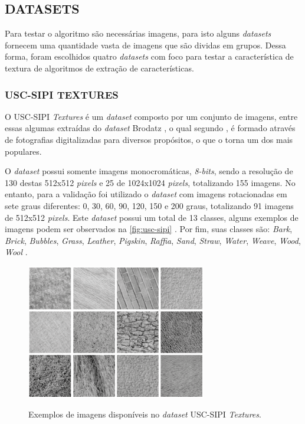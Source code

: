 \subsection{DATASETS}
\label{subsec:datasets}

\par Para testar o algoritmo são necessárias imagens, para isto alguns \textit{datasets} fornecem uma quantidade vasta de imagens que são dividas em grupos. Dessa forma, foram escolhidos quatro \textit{datasets} com foco para testar a característica de textura de algoritmos de extração de características.

\subsubsection{USC-SIPI TEXTURES}
\label{subsubsec:usc-spi}

\par O USC-SIPI \textit{Textures} \cite{weber1997usc} é um \textit{dataset} composto por um conjunto de imagens, entre essas algumas extraídas do \textit{dataset} Brodatz \cite{brodatz1966textures}, o qual segundo , é formado através de fotografias digitalizadas para diversos propósitos, o que o torna um dos mais populares.
\par O \textit{dataset} possui somente imagens monocromáticas, \textit{8-bits}, sendo a resolução de 130 destas 512x512 \textit{pixels} e 25 de 1024x1024 \textit{pixels}, totalizando 155 imagens. No entanto, para a validação foi utilizado o \textit{dataset} com imagens rotacionadas em sete graus diferentes: 0, 30, 60, 90, 120, 150 e 200 graus, totalizando 91 imagens de 512x512 \textit{pixels}. Este \textit{dataset} possui um total de 13 classes, alguns exemplos de imagens podem ser observados na \autoref{fig:usc-sipi} \cite{weber1997usc}. Por fim, suas classes são: \textit{Bark}, \textit{Brick}, \textit{Bubbles}, \textit{Grass}, \textit{Leather}, \textit{Pigskin}, \textit{Raffia}, \textit{Sand}, \textit{Straw},
\textit{Water}, \textit{Weave}, \textit{Wood}, \textit{Wool} \cite{weber1997usc}.

\begin{figure}[!h]
    \centering
    \caption{Exemplos de imagens disponíveis no \textit{dataset} USC-SIPI \textit{Textures}.}
    \includegraphics[width=0.7\textwidth]{./dados/figuras/usc-sipi.png}
    \label{fig:usc-sipi}
\end{figure}

